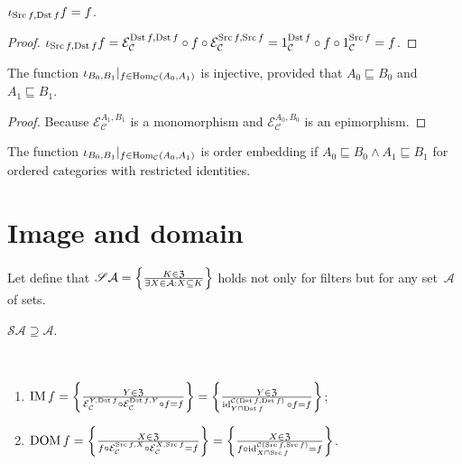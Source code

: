 \begin{prop}
  $\iota_{\operatorname{Src} f, \operatorname{Dst} f} f = f$.
\end{prop}

\begin{proof}
  $\iota_{\operatorname{Src} f, \operatorname{Dst} f} f = \mathcal{E}_\mathcal{C}^{\operatorname{Dst} f,\operatorname{Dst} f} \circ f \circ \mathcal{E}_\mathcal{C}^{\operatorname{Src} f,\operatorname{Src} f} =
  1_{\mathcal{C}}^{\operatorname{Dst} f} \circ f \circ 1_{\mathcal{C}}^{\operatorname{Src} f} = f$.
\end{proof}

\begin{prop}
  The function $\iota_{B_0, B_1} |_{f \in \operatorname{Hom}_{\mathcal{C}} (A_0 ,
  A_1)}$ is injective, provided that
  $A_0\sqsubseteq B_0$ and $A_1\sqsubseteq B_1$.
\end{prop}

\begin{proof}
  Because $\mathcal{E}_{\mathcal{C}}^{A_1,B_1}$ is a monomorphism and $\mathcal{E}_{\mathcal{C}}^{A_0,B_0}$ is an epimorphism.
\end{proof}

\begin{cor}\label{iota-emb}
  The function $\iota_{B_0, B_1} |_{f \in \operatorname{Hom}_{\mathcal{C}} (A_0 ,
  A_1)}$ is order embedding if $A_0 \sqsubseteq B_0 \wedge A_1 \sqsubseteq B_1$ for ordered categories
  with restricted identities.
\end{cor}

\section{Image and domain}

Let define that
$\mathscr{S}\mathcal{A}=\left\{ \frac{K\in\mathfrak{Z}}{
\exists X\in\mathcal{A}:X\subseteq K}\right\}$
holds not only for filters but for any set~$\mathcal{A}$ of
sets.

\begin{obvious}
$\mathscr{S}\mathcal{A}\supseteq\mathcal{A}$.
\end{obvious}

\begin{defn}
~
\begin{enumerate}
\item $\operatorname{IM} f = \left\{ \frac{Y \in \mathfrak{Z}}{\mathcal{E}_{\mathcal{C}}^{Y, \operatorname{Dst} f} \circ \mathcal{E}_{\mathcal{C}}^{\operatorname{Dst} f,
Y} \circ f = f}\right\} = \left\{ \frac{Y \in \mathfrak{Z}}{\operatorname{id}^{\mathcal{C}(\operatorname{Dst} f,\operatorname{Dst} f)}_{Y\sqcap\operatorname{Dst} f} \circ f = f}\right\}$;
\item $\operatorname{DOM} f = \left\{ \frac{X \in \mathfrak{Z}}{f\circ\mathcal{E}_{\mathcal{C}}^{\operatorname{Src} f, X} \circ \mathcal{E}_{\mathcal{C}}^{X, \operatorname{Src} f} = f}\right\} = \left\{ \frac{X \in \mathfrak{Z}}{f \circ \operatorname{id}^{\mathcal{C}(\operatorname{Src} f,\operatorname{Src} f)}_{X\sqcap\operatorname{Src} f} = f}\right\}$.
\end{enumerate}
\end{defn}

